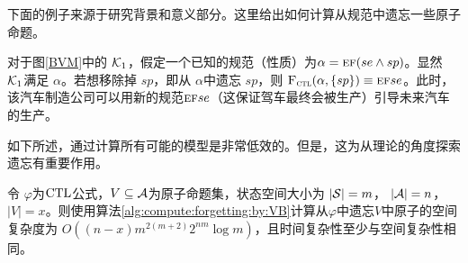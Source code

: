 下面的例子来源于研究背景和意义部分。这里给出如何计算从规范中遗忘一些原子命题。 
\begin{example}\label{ex:6}
	对于图\ref{BVM}中的 ${\cal K}_1$，假定一个已知的规范（性质）为$\alpha = \textsc{e}\textsc{f}(se \wedge sp)$。显然 ${\cal K}_1$满足 $\alpha$。若想移除掉 $sp$，即从 $\alpha$中遗忘 $sp$，则 ${\textsc{F}_{\textsc{ctl}}}(\alpha,\{ sp\}) \equiv \textsc{e}\textsc{f} se$。此时，该汽车制造公司可以用新的规范$\textsc{e}\textsc{f} se$（这保证驾车最终会被生产）引导未来汽车的生产。
\end{example}


如下所述，通过计算所有可能的模型是非常低效的。但是，这为从理论的角度探索遗忘有重要作用。


\begin{proposition}\label{pro:time:alg1}
	令 $\varphi$为$\textrm{CTL}$公式，$V\subseteq {\cal A}$为原子命题集，状态空间大小为 $|{\cal S}|=m$， $|{\cal A}|=n$，$|V|=x$。则使用算法\ref{alg:compute:forgetting:by:VB}计算从$\varphi$中遗忘$V$中原子的空间复杂度为 $O((n-x)m^{2(m+2)}2^{nm}  \log m)$，且时间复杂性至少与空间复杂性相同。
\end{proposition}
